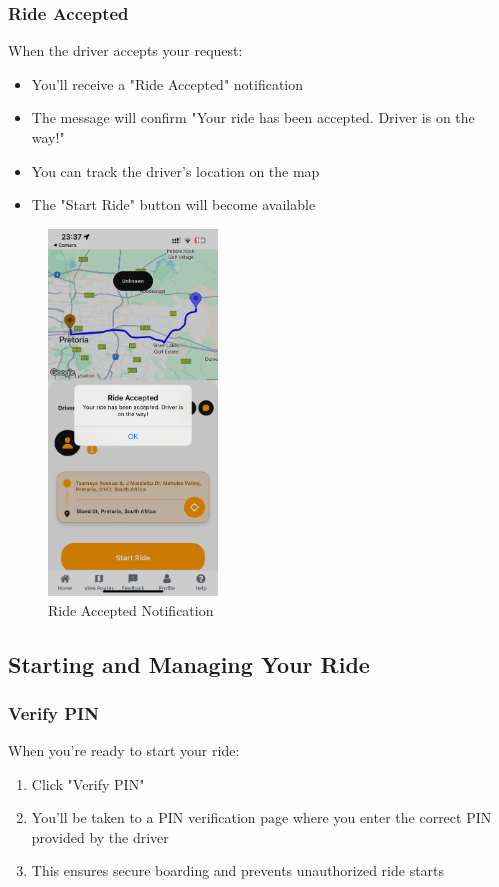 \documentclass[12pt]{article}
\begin{document}
\subsubsection{Ride Accepted}
When the driver accepts your request:
\begin{itemize}
    \item You'll receive a "Ride Accepted" notification
    \item The message will confirm "Your ride has been accepted. Driver is on the way!"
    \item You can track the driver's location on the map
    \item The "Start Ride" button will become available
\end{itemize}

\begin{figure}[H]
  \centering
  \includegraphics[width=0.4\textwidth]{ride_accepted.png}
  \caption{Ride Accepted Notification}
\end{figure}

\subsection{Starting and Managing Your Ride}

\subsubsection{Verify PIN}
When you're ready to start your ride:
\begin{enumerate}
    \item Click "Verify PIN"
    \item You'll be taken to a PIN verification page where you enter the correct PIN provided by the driver
    \item This ensures secure boarding and prevents unauthorized ride starts
\end{enumerate}
\end{document}
